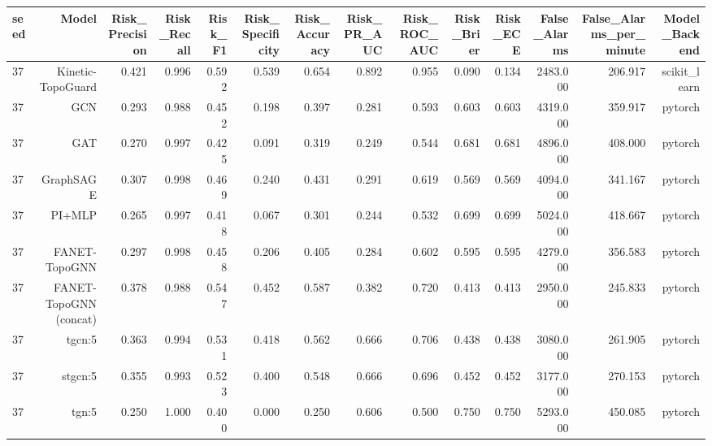 \begin{tabular}{lrrrrrrrrrrrrr}
\toprule
seed & Model & Risk\_Precision & Risk\_Recall & Risk\_F1 & Risk\_Specificity & Risk\_Accuracy & Risk\_PR\_AUC & Risk\_ROC\_AUC & Risk\_Brier & Risk\_ECE & False\_Alarms & False\_Alarms\_per\_minute & Model\_Backend \\
\midrule
37 & Kinetic-TopoGuard & 0.421 & 0.996 & 0.592 & 0.539 & 0.654 & 0.892 & 0.955 & 0.090 & 0.134 & 2483.000 & 206.917 & scikit\_learn \\
37 & GCN & 0.293 & 0.988 & 0.452 & 0.198 & 0.397 & 0.281 & 0.593 & 0.603 & 0.603 & 4319.000 & 359.917 & pytorch \\
37 & GAT & 0.270 & 0.997 & 0.425 & 0.091 & 0.319 & 0.249 & 0.544 & 0.681 & 0.681 & 4896.000 & 408.000 & pytorch \\
37 & GraphSAGE & 0.307 & 0.998 & 0.469 & 0.240 & 0.431 & 0.291 & 0.619 & 0.569 & 0.569 & 4094.000 & 341.167 & pytorch \\
37 & PI+MLP & 0.265 & 0.997 & 0.418 & 0.067 & 0.301 & 0.244 & 0.532 & 0.699 & 0.699 & 5024.000 & 418.667 & pytorch \\
37 & FANET-TopoGNN & 0.297 & 0.998 & 0.458 & 0.206 & 0.405 & 0.284 & 0.602 & 0.595 & 0.595 & 4279.000 & 356.583 & pytorch \\
37 & FANET-TopoGNN (concat) & 0.378 & 0.988 & 0.547 & 0.452 & 0.587 & 0.382 & 0.720 & 0.413 & 0.413 & 2950.000 & 245.833 & pytorch \\
37 & tgcn:5 & 0.363 & 0.994 & 0.531 & 0.418 & 0.562 & 0.666 & 0.706 & 0.438 & 0.438 & 3080.000 & 261.905 & pytorch \\
37 & stgcn:5 & 0.355 & 0.993 & 0.523 & 0.400 & 0.548 & 0.666 & 0.696 & 0.452 & 0.452 & 3177.000 & 270.153 & pytorch \\
37 & tgn:5 & 0.250 & 1.000 & 0.400 & 0.000 & 0.250 & 0.606 & 0.500 & 0.750 & 0.750 & 5293.000 & 450.085 & pytorch \\
\bottomrule
\end{tabular}
